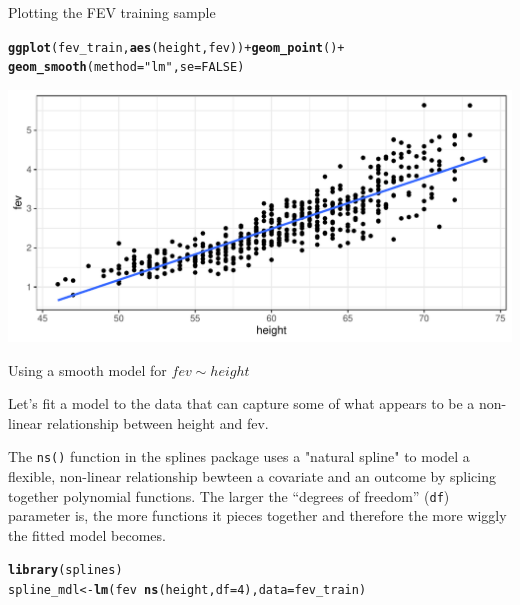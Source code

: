 \documentclass[table]{beamer}\usepackage[]{graphicx}\usepackage[]{color}
\makeatletter
\def\maxwidth{ %
  \ifdim\Gin@nat@width>\linewidth
    \linewidth
  \else
    \Gin@nat@width
  \fi
}
\newcommand{\hlnum}[1]{\textcolor[rgb]{0.686,0.059,0.569}{#1}}%
\newcommand{\hlstr}[1]{\textcolor[rgb]{0.192,0.494,0.8}{#1}}%
\newcommand{\hlopt}[1]{\textcolor[rgb]{0,0,0}{#1}}%
\newcommand{\hlstd}[1]{\textcolor[rgb]{0.345,0.345,0.345}{#1}}%
\newcommand{\hlkwb}[1]{\textcolor[rgb]{0.69,0.353,0.396}{#1}}%
\newcommand{\hlkwc}[1]{\textcolor[rgb]{0.333,0.667,0.333}{#1}}%
\newcommand{\hlkwd}[1]{\textcolor[rgb]{0.737,0.353,0.396}{\textbf{#1}}}%
\newenvironment{kframe}{%
 \def\at@end@of@kframe{}%
 \ifinner\ifhmode%
  \def\at@end@of@kframe{\end{minipage}}%
  \begin{minipage}{\columnwidth}%
 \fi\fi%
 \def\FrameCommand##1{\hskip\@totalleftmargin \hskip-\fboxsep
 \colorbox{shadecolor}{##1}\hskip-\fboxsep
     \hskip-\linewidth \hskip-\@totalleftmargin \hskip\columnwidth}%
 \MakeFramed {\advance\hsize-\width
   \@totalleftmargin\z@ \linewidth\hsize
   \@setminipage}}%
 {\par\unskip\endMakeFramed%
 \at@end@of@kframe}
\newenvironment{knitrout}{}{} %
\makeatother
\begin{document}
\begin{frame}[fragile]{Plotting the FEV training sample}

\scriptsize
\begin{knitrout}\footnotesize
{}\color{fgcolor}\begin{kframe}
\begin{alltt}
\hlkwd{ggplot}\hlstd{(fev_train,} \hlkwd{aes}\hlstd{(height, fev))} \hlopt{+} \hlkwd{geom_point}\hlstd{()} \hlopt{+}
  \hlkwd{geom_smooth}\hlstd{(}\hlkwc{method}\hlstd{=}\hlstr{"lm"}\hlstd{,} \hlkwc{se}\hlstd{=}\hlnum{FALSE}\hlstd{)}
\end{alltt}
\end{kframe}

{\centering \includegraphics[width=\maxwidth]{figs/beamer-unnamed-chunk-3-1} 

}


\end{knitrout}

\end{frame}


\begin{frame}[fragile]{Using a smooth model for $fev \sim height$}

Let's fit a model to the data that can capture some of what appears to be a non-linear relationship between height and fev.

The {\tt ns()} function in the splines package uses a "natural spline" to model a flexible, non-linear relationship bewteen a covariate and an outcome by splicing together polynomial functions. The larger the ``degrees of freedom'' ({\tt df}) parameter is, the more functions it pieces together and therefore the more wiggly the fitted model becomes.

\scriptsize
\begin{knitrout}\footnotesize
{}\color{fgcolor}\begin{kframe}
\begin{alltt}
\hlkwd{library}\hlstd{(splines)}
\hlstd{spline_mdl} \hlkwb{<-} \hlkwd{lm}\hlstd{(fev} \hlopt{~} \hlkwd{ns}\hlstd{(height,} \hlkwc{df} \hlstd{=} \hlnum{4}\hlstd{),} \hlkwc{data}\hlstd{=fev_train)}
\end{alltt}
\end{kframe}
\end{knitrout}

\end{frame}
\end{document}
